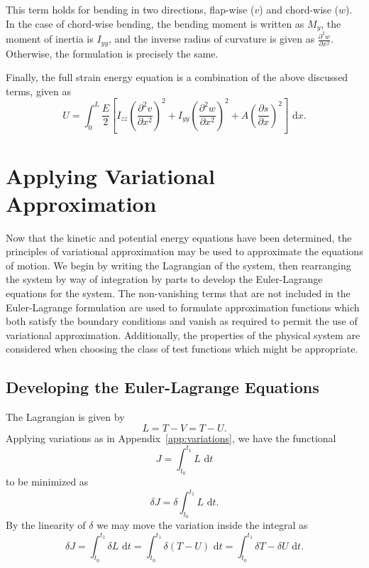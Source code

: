 This term holds for bending in two directions, flap-wise ($v$) and chord-wise ($w$). In the case of chord-wise bending, the bending moment is written as $M_y$, the moment of inertia is $I_{yy}$, and the inverse radius of curvature is given as $\frac{\partial^2w}{\partial x^2}$. Otherwise, the formulation is precisely the same.

Finally, the full strain energy equation is a combination of the above discussed terms, given as
\begin{equation}
U = \int_0^L\frac{E}{2}\left[I_{zz}\left(\frac{\partial^2 v}{\partial x^2}\right)^2+I_{yy}\left(\frac{\partial^2 w}{\partial x^2}\right)^2+A\left(\frac{\partial s}{\partial x}\right)^2\right]\text{ d}x.
\label{eq:strain.final.chooyung}
\end{equation}

\section{Applying Variational Approximation}
\label{sec:variations}
Now that the kinetic and potential energy equations have been determined, the principles of variational approximation may be used to approximate the equations of motion. We begin by writing the Lagrangian of the system, then rearranging the system by way of integration by parts to develop the Euler-Lagrange equations for the system. The non-vanishing terms that are not included in the Euler-Lagrange formulation are used to formulate approximation functions which both satisfy the boundary conditions and vanish as required to permit the use of variational approximation. Additionally, the properties of the physical system are considered when choosing the class of test functions which might be appropriate.

\subsection{Developing the Euler-Lagrange Equations}
The Lagrangian is given by 
\begin{equation}
L = T-V = T-U.
\end{equation}
Applying variations as in Appendix~\ref{app:variations}, we have the functional 
\begin{equation}
J = \int_{t_0}^{t_1}L\text{ d}t
\end{equation}
to be minimized as
\begin{equation}
\delta J = \delta\int_{t_0}^{t_1}L\text{ d}t.
\end{equation}
By the linearity of $\delta$ we may move the variation inside the integral as
\begin{equation}
\delta J = \int_{t_0}^{t_1}\delta L\text{ d}t = \int_{t_0}^{t_1}\delta (T-U)\text{ d}t = \int_{t_0}^{t_1}\delta T - \delta U\text{ d}t.
\end{equation}

